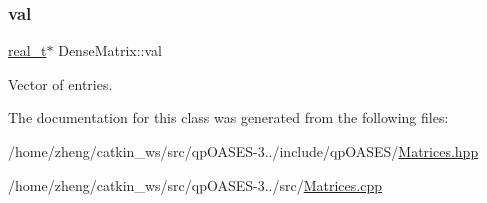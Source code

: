 \subsubsection{\texorpdfstring{val}{val}}
{\footnotesize\ttfamily \hyperlink{qp_o_a_s_e_s__wrapper_8h_a0d00e2b3dfadee81331bbb39068570c4}{real\+\_\+t}$\ast$ Dense\+Matrix\+::val\hspace{0.3cm}{\ttfamily [protected]}}

Vector of entries. 

The documentation for this class was generated from the following files\+:\begin{DoxyCompactItemize}
\item 
/home/zheng/catkin\+\_\+ws/src/qp\+O\+A\+S\+E\+S-\/3../include/qp\+O\+A\+S\+E\+S/\hyperlink{_matrices_8hpp}{Matrices.\+hpp}\item 
/home/zheng/catkin\+\_\+ws/src/qp\+O\+A\+S\+E\+S-\/3../src/\hyperlink{_matrices_8cpp}{Matrices.\+cpp}\end{DoxyCompactItemize}
